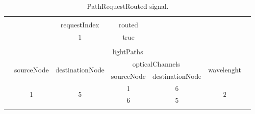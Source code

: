 \begin{table}[H]
	\centering
	\begin{tabular}{|lllclll|}
		\hline
		&                                                  &                                                       & \multicolumn{1}{l}{}            &                                      &                                                  &  \\ \cline{3-4}
		& \multicolumn{1}{l|}{}                            & \multicolumn{1}{c|}{requestIndex}                     & \multicolumn{1}{c|}{routed}     &                                      &                                                  &  \\ \cline{3-4}
		& \multicolumn{1}{l|}{}                            & \multicolumn{1}{c|}{1}                                & \multicolumn{1}{c|}{true}       &                                      &                                                  &  \\ \cline{3-4}
		&                                                  &                                                       & \multicolumn{1}{l}{}            &                                      &                                                  &  \\ \cline{2-6}
		\multicolumn{1}{|l|}{} & \multicolumn{5}{c|}{lightPaths}                                                                                                                                                                                                      &  \\ \cline{2-6}
		\multicolumn{1}{|l|}{} & \multicolumn{1}{l|}{\multirow{2}{*}{sourceNode}} & \multicolumn{1}{l|}{\multirow{2}{*}{destinationNode}} & \multicolumn{2}{c|}{opticalChannels}                                   & \multicolumn{1}{l|}{\multirow{2}{*}{wavelenght}} &  \\ \cline{4-5}
		\multicolumn{1}{|l|}{} & \multicolumn{1}{l|}{}                            & \multicolumn{1}{l|}{}                                 & \multicolumn{1}{l|}{sourceNode} & \multicolumn{1}{l|}{destinationNode} & \multicolumn{1}{l|}{}                            &  \\ \cline{2-6}
		\multicolumn{1}{|l|}{} & \multicolumn{1}{c|}{\multirow{2}{*}{1}}          & \multicolumn{1}{c|}{\multirow{2}{*}{5}}               & \multicolumn{1}{c|}{1}          & \multicolumn{1}{c|}{6}               & \multicolumn{1}{c|}{\multirow{2}{*}{2}}          &  \\ \cline{4-5}
		\multicolumn{1}{|l|}{} & \multicolumn{1}{c|}{}                            & \multicolumn{1}{c|}{}                                 & \multicolumn{1}{c|}{6}          & \multicolumn{1}{c|}{5}               & \multicolumn{1}{c|}{}                            &  \\ \cline{2-6}
		&                                                  &                                                       & \multicolumn{1}{l}{}            &                                      &                                                  &  \\ \hline
	\end{tabular}
	\caption{PathRequestRouted signal.}
\end{table}

